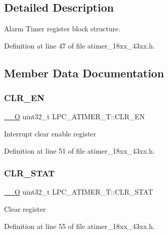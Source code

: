 \subsection{Detailed Description}
Alarm Timer register block structure. 

Definition at line 47 of file atimer\+\_\+18xx\+\_\+43xx.\+h.



\subsection{Member Data Documentation}
\mbox{\label{struct_l_p_c___a_t_i_m_e_r___t_a0c63291e63fedf8b332bf13806dcc1be}} 
\subsubsection{\texorpdfstring{C\+L\+R\+\_\+\+EN}{CLR\_EN}}
{\footnotesize\ttfamily \hyperlink{core__sc300_8h_a7e25d9380f9ef903923964322e71f2f6}{\+\_\+\+\_\+O} uint32\+\_\+t L\+P\+C\+\_\+\+A\+T\+I\+M\+E\+R\+\_\+\+T\+::\+C\+L\+R\+\_\+\+EN}

Interrupt clear enable register 

Definition at line 51 of file atimer\+\_\+18xx\+\_\+43xx.\+h.

\mbox{\label{struct_l_p_c___a_t_i_m_e_r___t_ac4386dfa2c7f25e393de9f146cce210f}} 
\subsubsection{\texorpdfstring{C\+L\+R\+\_\+\+S\+T\+AT}{CLR\_STAT}}
{\footnotesize\ttfamily \hyperlink{core__sc300_8h_a7e25d9380f9ef903923964322e71f2f6}{\+\_\+\+\_\+O} uint32\+\_\+t L\+P\+C\+\_\+\+A\+T\+I\+M\+E\+R\+\_\+\+T\+::\+C\+L\+R\+\_\+\+S\+T\+AT}

Clear register 

Definition at line 55 of file atimer\+\_\+18xx\+\_\+43xx.\+h.

